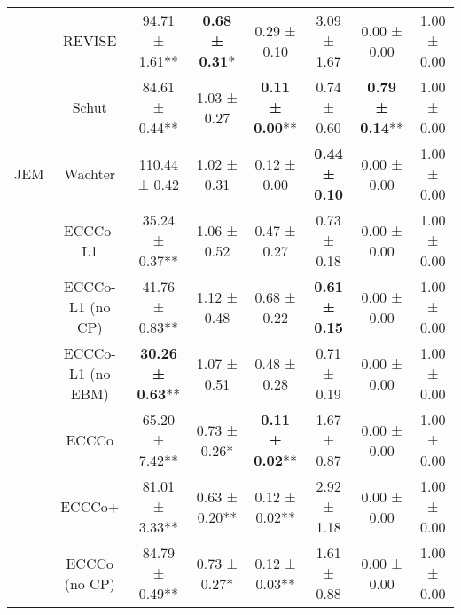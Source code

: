 \begin{table}
{\begin{tabular}[t]{cccccccc}
 & REVISE & 94.71 ± 1.61** & \textbf{0.68 ± 0.31}*\hphantom{*} & 0.29 ± 0.10\hphantom{*}\hphantom{*} & 3.09 ± 1.67\hphantom{*}\hphantom{*} & 0.00 ± 0.00\hphantom{*}\hphantom{*} & 1.00 ± 0.00\hphantom{*}\hphantom{*}\\

 & Schut & 84.61 ± 0.44** & 1.03 ± 0.27\hphantom{*}\hphantom{*} & \textbf{0.11 ± 0.00}** & 0.74 ± 0.60\hphantom{*}\hphantom{*} & \textbf{0.79 ± 0.14}** & 1.00 ± 0.00\hphantom{*}\hphantom{*}\\

\multirow[t]{-10}{*}{\centering\arraybackslash JEM} & Wachter & 110.44 ± 0.42\hphantom{*}\hphantom{*} & 1.02 ± 0.31\hphantom{*}\hphantom{*} & 0.12 ± 0.00\hphantom{*}\hphantom{*} & \textbf{0.44 ± 0.10}\hphantom{*}\hphantom{*} & 0.00 ± 0.00\hphantom{*}\hphantom{*} & 1.00 ± 0.00\hphantom{*}\hphantom{*}\\
\cmidrule{1-8}
 & ECCCo-L1 & 35.24 ± 0.37** & 1.06 ± 0.52\hphantom{*}\hphantom{*} & 0.47 ± 0.27\hphantom{*}\hphantom{*} & 0.73 ± 0.18\hphantom{*}\hphantom{*} & 0.00 ± 0.00\hphantom{*}\hphantom{*} & 1.00 ± 0.00\hphantom{*}\hphantom{*}\\

 & ECCCo-L1 (no CP) & 41.76 ± 0.83** & 1.12 ± 0.48\hphantom{*}\hphantom{*} & 0.68 ± 0.22\hphantom{*}\hphantom{*} & \textbf{0.61 ± 0.15}\hphantom{*}\hphantom{*} & 0.00 ± 0.00\hphantom{*}\hphantom{*} & 1.00 ± 0.00\hphantom{*}\hphantom{*}\\

 & ECCCo-L1 (no EBM) & \textbf{30.26 ± 0.63}** & 1.07 ± 0.51\hphantom{*}\hphantom{*} & 0.48 ± 0.28\hphantom{*}\hphantom{*} & 0.71 ± 0.19\hphantom{*}\hphantom{*} & 0.00 ± 0.00\hphantom{*}\hphantom{*} & 1.00 ± 0.00\hphantom{*}\hphantom{*}\\

 & ECCCo & 65.20 ± 7.42** & 0.73 ± 0.26*\hphantom{*} & \textbf{0.11 ± 0.02}** & 1.67 ± 0.87\hphantom{*}\hphantom{*} & 0.00 ± 0.00\hphantom{*}\hphantom{*} & 1.00 ± 0.00\hphantom{*}\hphantom{*}\\

 & ECCCo+ & 81.01 ± 3.33** & 0.63 ± 0.20** & 0.12 ± 0.02** & 2.92 ± 1.18\hphantom{*}\hphantom{*} & 0.00 ± 0.00\hphantom{*}\hphantom{*} & 1.00 ± 0.00\hphantom{*}\hphantom{*}\\

 & ECCCo (no CP) & 84.79 ± 0.49** & 0.73 ± 0.27*\hphantom{*} & 0.12 ± 0.03** & 1.61 ± 0.88\hphantom{*}\hphantom{*} & 0.00 ± 0.00\hphantom{*}\hphantom{*} & 1.00 ± 0.00\hphantom{*}\hphantom{*}\\


\end{tabular}}
\end{table}
